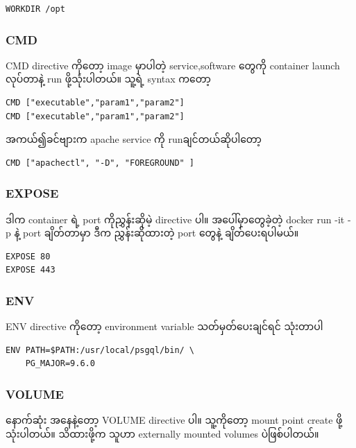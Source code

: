 \begin{verbatim}
WORKDIR /opt
\end{verbatim}

\subsubsection{CMD}\label{cmd}

CMD directive ကို​တော့ image မှာပါတဲ့ service,software ​တွေကို container
launch လုပ်​​တာနဲ့ run ဖို့သုံးပါတယ်။​ သူ့ရဲ့ syntax က​တော့

\begin{verbatim}
CMD ["executable","param1","param2"]
CMD ["executable","param1","param2"]
\end{verbatim}

အကယ်​၍ခင်​​ဗျားက apache service ကို runချင်​တယ်​ဆိုပါ​တော့

\begin{verbatim}
CMD ["apachectl", "-D", "FOREGROUND" ]
\end{verbatim}

\subsubsection{EXPOSE}\label{expose}

ဒါက container ရဲ့ port ကိုညွှန်းဆိုမဲ့ directive ပါ။ အ​ပေါ်မှာ​တွေခဲ့တဲ့
docker run -it -p နဲ့ port ချိတ်​တာမှာ ဒီက ညွှန်းဆိုထားတဲ့ port ​တွေနဲ့
ချိတ်​​ပေးရပါမယ်​။

\begin{verbatim}
EXPOSE 80
EXPOSE 443
\end{verbatim}

\subsubsection{ENV}\label{env}

ENV directive ကို​တော့ environment variable သတ်​မှတ်​​ပေးချင်​ရင်​
သုံးတာပါ

\begin{verbatim}
ENV PATH=$PATH:/usr/local/psgql/bin/ \
    PG_MAJOR=9.6.0
\end{verbatim}

\subsubsection{VOLUME}\label{volume}

​နောက်​ဆုံး အ​နေနဲ့​တော့ VOLUME directive ပါ။ သူ့ကို​တော့ mount point
create ဖို့ သုံးပါတယ်​။ သိထားဖို့က သူဟာ externally mounted volumes
ပဲဖြစ်​ပါတယ်​။

